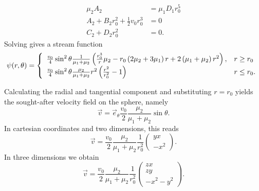 \begin{ex}
\begin{subequations}
\begin{align}
		\mu_2A_2&=\mu_1D_1r_0^5\\
		A_2+B_2r_0^2+\frac{1}{2}v_0r_0^3&=0\\
		C_2+D_2r_0^2&=0.
	\end{align}
\end{subequations}
Solving  gives a stream function
\begin{equation}
	\psi\!\left(r,\theta\right)=\left\{
	\begin{array}{ll}
		\frac{v_0}{4}\sin^2\theta\frac{1}{\mu_1+\mu_2}\left(\frac{r_0^3}{r}\mu_2-r_0\left(2\mu_2+3\mu_1\right)r+2\left(\mu_1+\mu_2\right)r^2\right),&r\geq r_0\\
		\frac{v_0}{4}\sin^2\theta\frac{\mu_2}{\mu_1+\mu_2}r^2\left(\frac{r^2}{r_0^2}-1\right)&r\leq r_0.
	\end{array}
	\right.
\end{equation}
\end{ex}
Calculating the radial and tangential component and substituting $r=r_0$ yields the sought-after velocity field on the sphere, namely
\begin{equation}
	\vec v=\vec e_\theta \frac{v_0}{2}\frac{\mu_2}{\mu_1+\mu_2}\sin\theta.
\end{equation}
In cartesian coordinates and two dimensions, this reads
\begin{equation}
	\vec v=\frac{v_0}{2}\frac{\mu_2}{\mu_1+\mu_2}\frac{1}{r_0^2}\left(\!\!\begin{array}{c}yx\\-x^2\end{array}\!\!\right).
\end{equation}
In three dimensions we obtain
\begin{equation}
	\vec v=\frac{v_0}{2}\frac{\mu_2}{\mu_1+\mu_2}\frac{1}{r_0^2}\left(\!\!\begin{array}{c}zx\\zy\\-x^2-y^2\end{array}\!\!\right).
\end{equation}